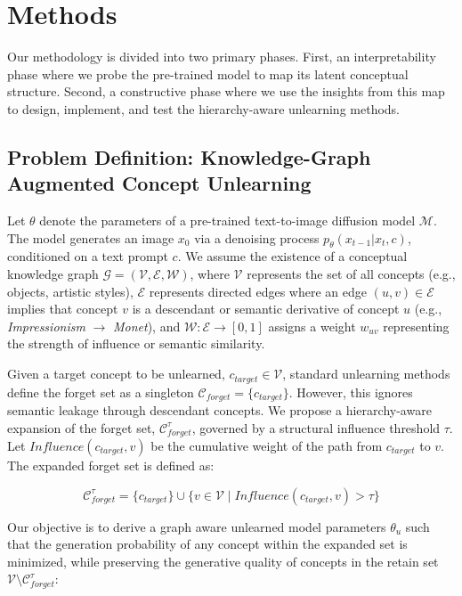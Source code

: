 \section{Methods}
Our methodology is divided into two primary phases. First, an interpretability phase where we probe the pre-trained model to map its latent conceptual structure. Second, a constructive phase where we use the insights from this map to design, implement, and test the hierarchy-aware unlearning methods.

\subsection{Problem Definition: Knowledge-Graph Augmented Concept Unlearning}

Let $\theta$ denote the parameters of a pre-trained text-to-image diffusion model $\mathcal{M}$. The model generates an image $x_0$ via a denoising process $p_\theta(x_{t-1}|x_t, c)$, conditioned on a text prompt $c$. We assume the existence of a conceptual knowledge graph $\mathcal{G} = (\mathcal{V}, \mathcal{E}, \mathcal{W})$, where $\mathcal{V}$ represents the set of all concepts (e.g., objects, artistic styles), $\mathcal{E}$ represents directed edges where an edge $(u, v) \in \mathcal{E}$ implies that concept $v$ is a descendant or semantic derivative of concept $u$ (e.g., \textit{Impressionism} $\to$ \textit{Monet}), and $\mathcal{W}: \mathcal{E} \to [0, 1]$ assigns a weight $w_{uv}$ representing the strength of influence or semantic similarity.

Given a target concept to be unlearned, $c_{target} \in \mathcal{V}$, standard unlearning methods define the forget set as a singleton $\mathcal{C}_{forget} = \{c_{target}\}$. However, this ignores semantic leakage through descendant concepts. We propose a hierarchy-aware expansion of the forget set, $\mathcal{C}^\tau_{forget}$, governed by a structural influence threshold $\tau$. Let $Influence(c_{target}, v)$ be the cumulative weight of the path from $c_{target}$ to $v$. The expanded forget set is defined as:

\begin{equation}
    \mathcal{C}^\tau_{forget} = \{c_{target}\} \cup \{ v \in \mathcal{V} \mid Influence(c_{target}, v) > \tau \}
\end{equation}



Our objective is to derive a graph aware unlearned model parameters $\theta_{u}$ such that the generation probability of any concept within the expanded set is minimized, while preserving the generative quality of concepts in the retain set $\mathcal{V} \setminus \mathcal{C}^\tau_{forget}$:

